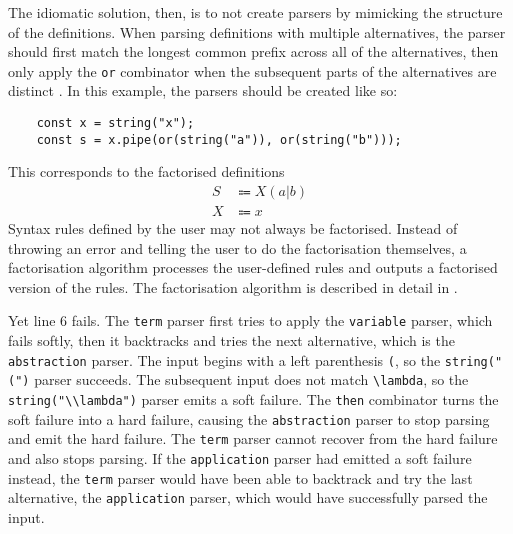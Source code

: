 The idiomatic solution, then, is to not create parsers by mimicking the structure of the definitions. When parsing definitions with multiple alternatives, the parser should first match the longest common prefix across all of the alternatives, then only apply the \lstinline{or} combinator when the subsequent parts of the alternatives are distinct \cite{parjs}. In this example, the parsers should be created like so:
\begin{lstlisting}
    const x = string("x");
    const s = x.pipe(or(string("a")), or(string("b")));
\end{lstlisting}
This corresponds to the factorised definitions
\begin{align*}
    S &\Coloneqq X(a|b) \\
    X &\Coloneqq x
\end{align*}
Syntax rules defined by the user may not always be factorised. Instead of throwing an error and telling the user to do the factorisation themselves, a factorisation algorithm processes the user-defined rules and outputs a factorised version of the rules. The factorisation algorithm is described in detail in .

Yet line 6 fails. The \lstinline{term} parser first tries to apply the \lstinline{variable} parser, which fails softly, then it backtracks and tries the next alternative, which is the \lstinline{abstraction} parser. The input begins with a left parenthesis \lstinline{(}, so the \lstinline{string("(")} parser succeeds. The subsequent input does not match \lstinline{\lambda}, so the \lstinline{string("\\lambda")} parser emits a soft failure. The \lstinline{then} combinator turns the soft failure into a hard failure, causing the \lstinline{abstraction} parser to stop parsing and emit the hard failure. The \lstinline{term} parser cannot recover from the hard failure and also stops parsing. If the \lstinline{application} parser had emitted a soft failure instead, the \lstinline{term} parser would have been able to backtrack and try the last alternative, the \lstinline{application} parser, which would have successfully parsed the input.



